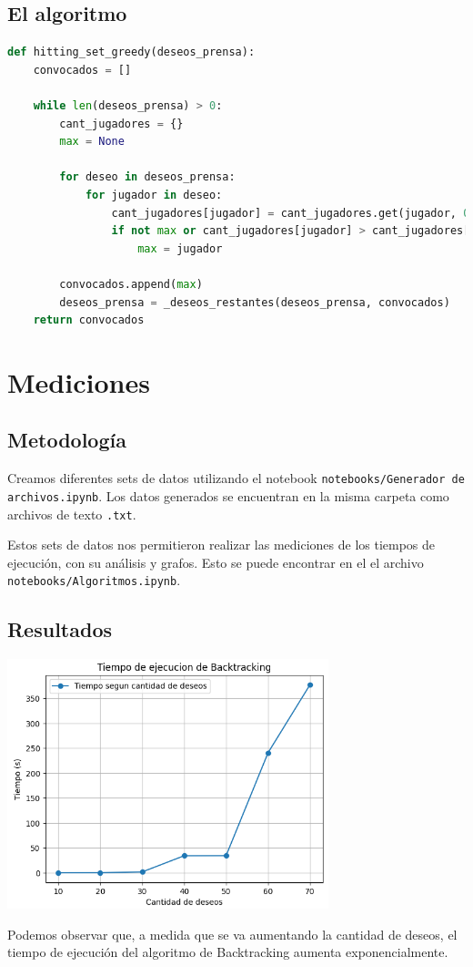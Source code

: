 \documentclass{estilo}
\begin{document}
\subsection{El algoritmo}

\begin{lstlisting}[language=Python]
def hitting_set_greedy(deseos_prensa):
    convocados = []

    while len(deseos_prensa) > 0:
        cant_jugadores = {}
        max = None
        
        for deseo in deseos_prensa:
            for jugador in deseo:
                cant_jugadores[jugador] = cant_jugadores.get(jugador, 0) + 1
                if not max or cant_jugadores[jugador] > cant_jugadores[max]:
                    max = jugador
                    
        convocados.append(max)
        deseos_prensa = _deseos_restantes(deseos_prensa, convocados)
    return convocados
\end{lstlisting}

\newpage

\section{Mediciones}
\subsection{Metodología}

Creamos diferentes sets de datos utilizando el notebook \texttt{notebooks/Generador de archivos.ipynb}. Los datos generados se encuentran en la misma carpeta como archivos de texto \texttt{.txt}.

Estos sets de datos nos permitieron realizar las mediciones de los tiempos de ejecución, con su análisis y grafos. Esto se puede encontrar en el el archivo \texttt{notebooks/Algoritmos.ipynb}.

\subsection{Resultados}

\begin{center}
\includegraphics[width=0.7\textwidth]{img/tiempo_backtracking.png}

Podemos observar que, a medida que se va aumentando la cantidad de deseos, el tiempo de ejecución del algoritmo de Backtracking aumenta exponencialmente.
\end{center}
\end{document}
